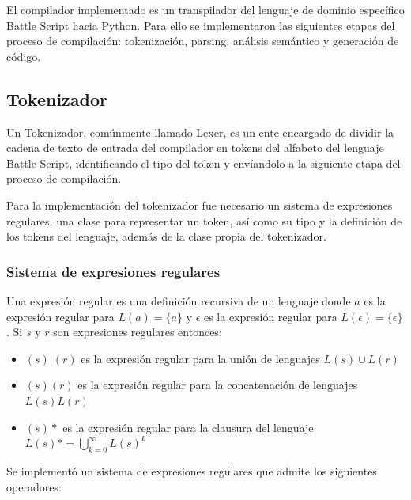 El compilador implementado es un transpilador del lenguaje de dominio específico Battle Script hacia Python. Para ello se implementaron las siguientes etapas del proceso de compilación: tokenización, parsing, análisis semántico y generación de código.

\subsection{Tokenizador}

Un Tokenizador, comúnmente llamado Lexer, es un ente encargado de dividir la cadena de texto de entrada del compilador en tokens del alfabeto del lenguaje Battle Script, identificando el tipo del token y envíandolo a la siguiente etapa del proceso de compilación.

Para la implementación del tokenizador fue necesario un sistema de expresiones regulares, una clase para representar un token, así como su tipo y la definición de los tokens del lenguaje, además de la clase propia del tokenizador. 

\subsubsection{Sistema de expresiones regulares}

Una expresión regular es una definición recursiva de un lenguaje donde $a$ es la expresión regular para $L(a) = \{a\}$ y $\epsilon$ es la expresión regular para $L(\epsilon) = \{\epsilon\}$. Si $s$ y $r$ son expresiones regulares entonces:

\begin{itemize}
    \item $(s)|(r)$ es la expresión regular para la unión de lenguajes $L(s) \cup L(r)$
    \item $(s)(r)$ es la expresión regular para la concatenación de lenguajes $L(s)L(r)$
    \item $(s)*$ es la expresión regular para la clausura del lenguaje $L(s)* = \bigcup\limits_{k=0}^{\infty} L(s)^k$
\end{itemize}

Se implementó un sistema de expresiones regulares que admite los siguientes operadores:

